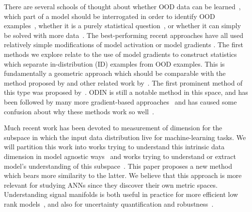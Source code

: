 There are several schools of thought about whether OOD data can be learned~\citep{huang2021scaling, mohseni2020, he2015, pillai2013classification, fumera2002}, which part of a model should be interrogated in order to identify OOD examples~\citep{liu2020, lin2021}, whether it is a purely statistical question~\citep{lee2018}, or whether it can simply be solved with more data~\citep{chen2021atom, de_silva_value_2023}. 
The best-performing recent approaches have all used relatively simple modifications of model activation or model gradients \citep{djurisic2023extremely, xu2023vra, sun2022, sun2021}. 
The first methods we explore relate to the use of model gradients to construct statistics which separate in-distribution (ID) examples from OOD examples. 
This is fundamentally a geometric approach which should be comparable
with the method proposed by \citet{sun2022deep} and other related work
by~\citet{gillette2022data}. 
The first prominent method of this type was proposed by~\citet{liang2018}. 
ODIN is still a notable method in this space, and has been followed by many more gradient-based approaches~\citep{behpour2023, huang2021gradients} and has caused some confusion about why these methods work so well~\citep{igoe2022}.

Much recent work has been devoted to measurement of dimension for the subspace in which the input data distribution live for machine-learning tasks.
We will partition this work into works trying to understand this intrinsic data dimension in model agnostic ways~\citep{gillette2022data, yousefzadeh2021deep, kaufman_data_2023, gilmer2018, gong2019, glielmo2022, facco2018, Levina_Bickel_2004} and works trying to understand or extract model's understanding of this subspace~\citep{dominguez-olmedo_data_2023, Ansuini_Laio_Macke_Zoccolan_2019, talwalker2008, Costa_Hero_2004b, giryes2014, Zheng_He_Qiu_Wipf_2022}. 
This paper proposes a new method which bears more similarity to the latter. 
We believe that this approach is more relevant for studying ANNs since they discover their own metric spaces. 
Understanding signal manifolds is both useful in practice for more efficient low rank models~\citep{yang2020, swaminathan2020}, and also for uncertainty quantification and robustness~\citep{Costa_Hero_2004a, wang2021, khoury2018, srinivas2023, song2018pixeldefend, snoek2019}. 


